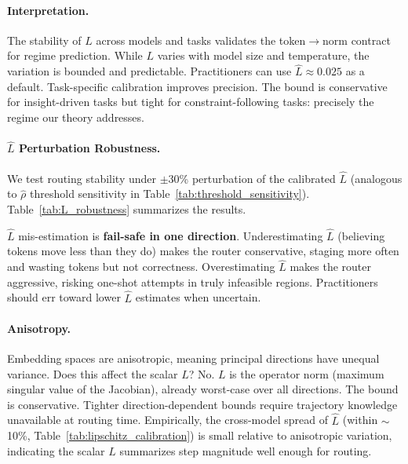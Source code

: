 \documentclass{article}
\theoremstyle{plain}
\theoremstyle{definition}
\theoremstyle{remark}
\newcommand{\rhohat}{\hat{\rho}}
\begin{document}
\paragraph{Interpretation.}
The stability of $L$ across models and tasks validates the token$\to$norm contract for regime prediction. While $L$ varies with model size and temperature, the variation is bounded and predictable. Practitioners can use $\hat{L} \approx 0.025$ as a default. Task-specific calibration improves precision. The bound is conservative for insight-driven tasks but tight for constraint-following tasks: precisely the regime our theory addresses.

\paragraph{$\hat{L}$ Perturbation Robustness.}
We test routing stability under $\pm$30\% perturbation of the calibrated $\hat{L}$ (analogous to $\rhohat$ threshold sensitivity in Table~\ref{tab:threshold_sensitivity}). Table~\ref{tab:L_robustness} summarizes the results.

\begin{table}[ht]
\centering
\small
\caption{$\hat{L}$ perturbation robustness. Underestimating $\hat{L}$ triggers more staging (fail-safe). Overestimating risks 3\% pass rate loss.}
\label{tab:L_robustness}
\end{table}

\noindent $\hat{L}$ mis-estimation is \textbf{fail-safe in one direction}. Underestimating $\hat{L}$ (believing tokens move less than they do) makes the router conservative, staging more often and wasting tokens but not correctness. Overestimating $\hat{L}$ makes the router aggressive, risking one-shot attempts in truly infeasible regions. Practitioners should err toward lower $\hat{L}$ estimates when uncertain.

\paragraph{Anisotropy.}\label{par:anisotropy}
Embedding spaces are anisotropic, meaning principal directions have unequal variance. Does this affect the scalar $L$? No. $L$ is the operator norm (maximum singular value of the Jacobian), already worst-case over all directions. The bound is conservative. Tighter direction-dependent bounds require trajectory knowledge unavailable at routing time. Empirically, the cross-model spread of $\hat{L}$ (within $\sim$10\%, Table~\ref{tab:lipschitz_calibration}) is small relative to anisotropic variation, indicating the scalar $\hat{L}$ summarizes step magnitude well enough for routing.
\end{document}
